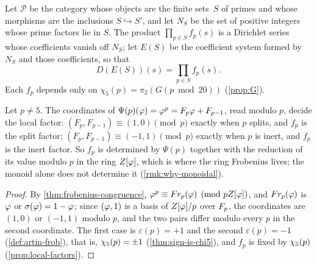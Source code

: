 \begin{definition}\label{def:partial-euler}
Let $\mathcal{P}$ be the category whose objects are the finite
sets~$S$ of primes and whose morphisms are the inclusions
$S\hookrightarrow S'$, and let $N_S$ be the set of positive integers whose prime factors lie in $S$.  The
product $\prod_{p\in S}f_p(s)$ is a Dirichlet series whose coefficients vanish off $N_S$; let $E(S)$ be the
coefficient system formed by $N_S$ and those coefficients, so that
\begin{equation}\label{eq:partial-euler}
  D(E(S))(s) = \prod_{p\in S} f_p(s).
\end{equation}
Each $f_p$ depends only on $\chi_5(p) = \pi_2(G(p\bmod 20))$
(\cref{prop:G}).
\end{definition}

\begin{lemma}\label{lem:psi-to-euler}
Let $p\neq5$.  The coordinates of $\Psi(p)(\varphi)=\varphi^p=F_p\varphi+F_{p-1}$, read modulo $p$, decide the local
factor: $(F_p,F_{p-1})\equiv(1,0)\pmod p$ exactly when $p$ splits, and $f_p$ is the split factor;
$(F_p,F_{p-1})\equiv(-1,1)\pmod p$ exactly when $p$ is inert, and $f_p$ is the inert factor.  So $f_p$ is determined by
$\Psi(p)$ together with the reduction of its value modulo $p$ in the ring $Z[\varphi]$, which is where the ring Frobenius
lives; the monoid alone does not determine it (\cref{rmk:why-monoidal}).
\end{lemma}
\begin{proof}
By \cref{thm:frobenius-congruence}, $\varphi^p\equiv Fr_p(\varphi)\pmod{pZ[\varphi]}$, and $Fr_p(\varphi)$ is $\varphi$
or $\sigma(\varphi)=1-\varphi$; since $(\varphi,1)$ is a basis of $Z[\varphi]/p$ over $F_p$, the coordinates are
$(1,0)$ or $(-1,1)$ modulo $p$, and the two pairs differ modulo every $p$ in the second coordinate.  The first case
is $\varepsilon(p)=+1$ and the second $\varepsilon(p)=-1$ (\cref{def:artin-frob}), that is, $\chi_5(p)=\pm1$
(\cref{thm:sign-is-chi5}), and $f_p$ is fixed by $\chi_5(p)$ (\cref{prop:local-factors}).
\end{proof}

